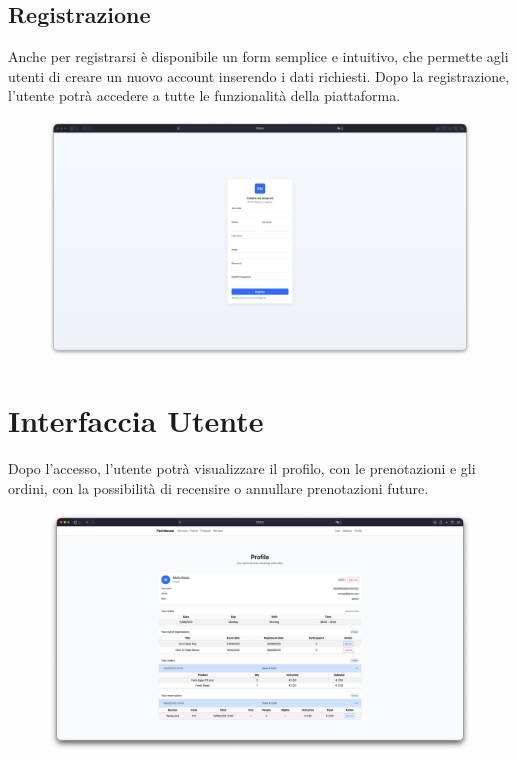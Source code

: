 \documentclass[a4paper,12pt]{report}
\begin{document}
\subsection*{Registrazione}
Anche per registrarsi è disponibile un form semplice e intuitivo, che permette agli utenti di creare un nuovo 
account inserendo i dati richiesti. Dopo la registrazione, l'utente potrà accedere a tutte le funzionalità della 
piattaforma.

\begin{figure}[H]
    \centering
    \includegraphics[width=\textwidth, trim=0 0 0 0]{./img/register.png}
    \vspace{-1em}
    \label{fig:registrazione}
\end{figure}

\newpage
\section{Interfaccia Utente}
Dopo l'accesso, l'utente potrà visualizzare il profilo, con le prenotazioni e gli ordini, con 
la possibilità di recensire o annullare prenotazioni future.

\begin{figure}[H]
    \centering
    \includegraphics[width=\textwidth, trim=0 0 0 0]{./img/users/profile.png}
    \vspace{-1em}
    \label{fig:profile}
\end{figure}
\end{document}
